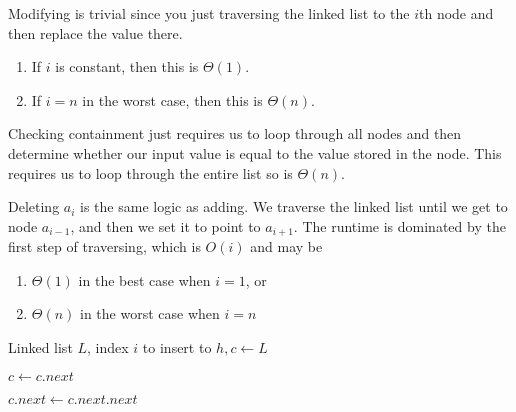   \begin{algo}
    Modifying is trivial since you just traversing the linked list to the $i$th node and then replace the value there. 
    \begin{enumerate}
      \item If $i$ is constant, then this is $\Theta(1)$. 
      \item If $i = n$ in the worst case, then this is $\Theta(n)$. 
    \end{enumerate}
  \end{algo}

  \begin{algo}
    Checking containment just requires us to loop through all nodes and then determine whether our input value is equal to the value stored in the node. This requires us to loop through the entire list so is $\Theta(n)$. 
  \end{algo}

  \begin{algo}
    Deleting $a_i$ is the same logic as adding. We traverse the linked list until we get to node $a_{i-1}$, and then we set it to point to $a_{i+1}$. The runtime is dominated by the first step of traversing, which is $O(i)$ and may be 
    \begin{enumerate}
      \item $\Theta(1)$ in the best case when $i=1$, or 
      \item $\Theta(n)$ in the worst case when $i=n$
    \end{enumerate}

    \begin{algorithmic}[1]
      \State Linked list $L$, index $i$ to insert to 
      \State $h, c \gets L$  
      
        \State $c \gets c.next$
      \EndFor 

      \State $c.next \gets c.next.next$ 
      \State {} 
      \EndProcedure
    \end{algorithmic}
  \end{algo} 

